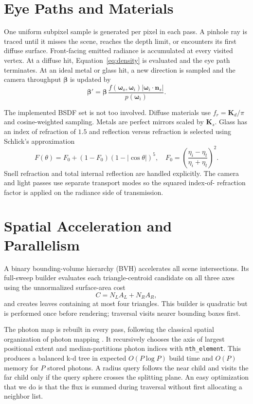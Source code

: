 \documentclass[10pt,twocolumn]{article}
\begin{document}
\section{Eye Paths and Materials}

One uniform subpixel sample is generated per pixel in each pass.  A pinhole ray
is traced until it misses the scene, reaches the depth limit, or encounters its
first diffuse surface.  Front-facing emitted radiance is accumulated at every
visited vertex.  At a diffuse hit, Equation~\ref{eq:density} is evaluated and
the eye path terminates.  At an ideal metal or glass hit, a new direction
is sampled and the camera throughput $\boldsymbol\beta$ is updated by
\begin{equation}
 \boldsymbol\beta' = \boldsymbol\beta\,
 \frac{f(\boldsymbol\omega_o,\boldsymbol\omega_i)
       |\boldsymbol\omega_i\cdot\mathbf n_s|}{p(\boldsymbol\omega_i)}.
\end{equation}

The implemented BSDF set is not too involved.  Diffuse materials use
$f_r=\mathbf K_d/\pi$ and cosine-weighted sampling.  Metals are perfect mirrors
scaled by $\mathbf K_s$.  Glass has an index of refraction of
$1.5$ and reflection versus refraction is selected using Schlick's approximation
\begin{equation}
 F(\theta)=F_0+(1-F_0)(1-|\cos\theta|)^5,
 \quad
 F_0=\left(\frac{\eta_i-\eta_t}{\eta_i+\eta_t}\right)^2.
\end{equation}
Snell refraction and total internal reflection are handled explicitly.  The
camera and light passes use separate transport modes so the squared index-of-
refraction factor is applied on the radiance side of transmission.

\section{Spatial Acceleration and Parallelism}

A binary bounding-volume hierarchy (BVH)
accelerates all scene intersections.  Its full-sweep builder evaluates each
triangle-centroid candidate on all three axes using the unnormalized
surface-area cost
\begin{equation}
 C=N_L A_L+N_R A_R,
\end{equation}
and creates leaves containing at most four triangles.  This builder is
quadratic but is performed once before rendering; traversal visits nearer
bounding boxes first.

The photon map is rebuilt in every pass, following the classical spatial
organization of photon mapping \cite{jensen2001}.  It recursively chooses the axis of
largest positional extent and median-partitions photon indices with
\texttt{nth\_element}.  This produces a balanced k-d tree in expected
$O(P\log P)$ build time and $O(P)$ memory for $P$ stored photons.  A radius
query follows the near child and visits the far child only if the query sphere
crosses the splitting plane.  An easy optimization that we do is that the flux is summed during traversal without first
allocating a neighbor list.
\end{document}
